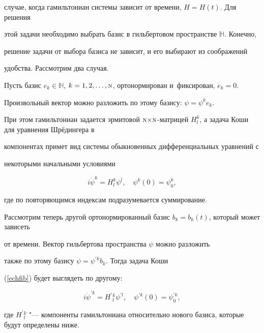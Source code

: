случае, когда гамильтониан системы зависит от времени, $H=H(t)$. Для решения

этой задачи необходимо выбрать базис в гильбертовом пространстве $\mathbb H$. Конечно,

решение задачи от выбора базиса не зависит, и его выбирают из соображений

удобства. Рассмотрим два случая.



Пусть базис $e_k\in\mathbb H$, $k=1, 2, \dotsc, {\textsc{n}}$, ортонормирован и~фиксирован, \mbox{$\dot e_k=0$.} 

Произвольный вектор можно разложить по этому базису: $\psi=\psi^k e_k$. 

При этом гамильтониан задается эрмитовой ${\textsc{n}}{\times}{\textsc{n}}$-матрицей $H_l^k$, а задача Коши для уравнения Шрёдингера в

компонентах примет вид системы обыкновенных дифференциальных уравнений с

некоторыми начальными условиями

\begin{equation}                                                  \label{echfib}

  i\dot\psi^k=H_l^k\psi^l,

\quad 

  \psi^k(0)=\psi_0^k,

\end{equation}

где по повторяющимся индексам подразумевается суммирование.



Рассмотрим теперь другой ортонормированный базис $b_k=b_k(t)$, который может зависеть

от времени. Вектор гильбертова пространства $\psi$ можно разложить

также по этому базису $\psi=\psi^{\prime k}b_k$. Тогда задача Коши

(\ref{echfib}) будет выглядеть по другому:

\begin{equation}                                                  \label{echneb}

  i\dot\psi^{\prime k}=H^\prime{}_l^k\psi^{\prime l},

\quad 

  \psi^{\prime k}(0)=\psi^{\prime k}_0,

\end{equation}

где $H^\prime{}_l^k$ "--- компоненты гамильтониана относительно нового базиса, которые будут определены ниже. 

